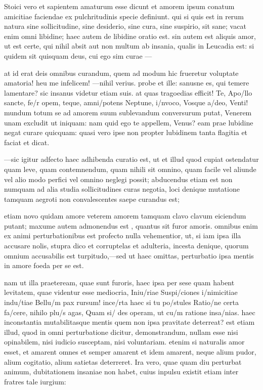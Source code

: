  Stoici vero et sapientem amaturum esse dicunt et amorem ipsum conatum amicitiae faciendae ex pulchritudinis specie definiunt. qui si quis est in rerum natura sine sollicitudine, sine desiderio, sine cura, sine suspirio, sit sane; vacat enim omni libidine; haec autem de libidine oratio est. sin autem est aliquis amor, ut est certe, qui nihil absit aut non multum ab insania, qualis in Leucadia est: si quidem sit quisquam deus, cui ego sim curae —

 at id erat deis omnibus curandum, quem ad modum hic frueretur voluptate amatoria! heu me infelicem! —nihil verius. probe et ille: sanusne es, qui temere lamentare? sic insanus videtur etiam suis. at quas tragoedias efficit! Te, Apo/llo sancte, fe/r opem, teque, amni/potens Neptune, i/nvoco, Vosque a/deo, Venti! mundum totum se ad amorem suum sublevandum conversurum putat, Venerem unam excludit ut iniquam: nam quid ego te appellem, Venus? eam prae lubidine negat curare quicquam: quasi vero ipse non propter lubidinem tanta flagitia et faciat et dicat.

 —sic igitur adfecto haec adhibenda curatio est, ut et illud quod cupiat ostendatur quam leve, quam contemnendum, quam nihili sit omnino, quam facile vel aliunde vel alio modo perfici vel omnino neglegi possit; abducendus etiam est non numquam ad alia studia sollicitudines curas negotia, loci denique mutatione tamquam aegroti non convalescentes saepe curandus est;

 etiam novo quidam amore veterem amorem tamquam clavo clavum eiciendum putant; maxume autem admonendus est , quantus sit furor amoris. omnibus enim ex animi perturbationibus est profecto nulla vehementior, ut, si iam ipsa illa accusare nolis, stupra dico et corruptelas et adulteria, incesta denique, quorum omnium accusabilis est turpitudo,—sed ut haec omittas, perturbatio ipsa mentis in amore foeda per se est.

 nam ut illa praeteream, quae sunt furoris, haec ipsa per sese quam habent levitatem, quae videntur esse mediocria, Iniu/riae Suspi/ciones i/nimicitiae indu/tiae Bellu/m pax rursum! ince/rta haec si tu po/stules Ratio/ne certa fa/cere, nihilo plu/s agas, Quam si/ des operam, ut cu/m ratione insa/nias. haec inconstantia mutabilitasque mentis quem non ipsa pravitate deterreat? est etiam illud, quod in omni perturbatione dicitur, demonstrandum, nullam esse nisi opinabilem, nisi iudicio susceptam, nisi voluntariam. etenim si naturalis amor esset, et amarent omnes et semper amarent et idem amarent, neque alium pudor, alium cogitatio, alium satietas deterreret. Ira vero, quae quam diu perturbat animum, dubitationem insaniae non habet, cuius inpulsu existit etiam inter fratres tale iurgium:

